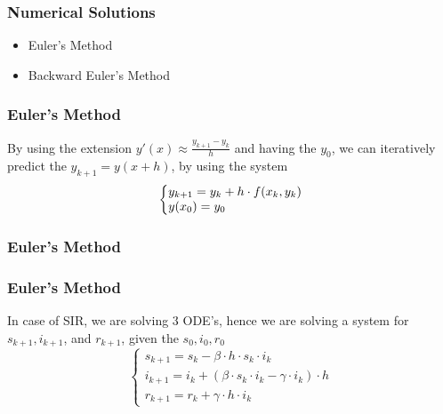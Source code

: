 \documentclass{beamer}
\makeatletter
\newenvironment{system}%
{\left\lbrace\begin{array}{@{}l@{}}}%
{\end{array}\right.}
\makeatother
\begin{document}
\begin{frame}\frametitle{Numerical Solutions}
\begin{itemize}
\item Euler's Method
\item Backward Euler's Method
\end{itemize}
\end{frame}

\begin{frame}\frametitle{Euler's Method}
    By using the extension $y'(x) \approx \frac{y_{k+1}-y_{k}}{h}$ and having the
$y_0$, we can iteratively predict the $y_{k+1}=y(x+h)$, by using the system
\vspace{1.5cm}
\large
\begin{equation*}
    \begin{system}
	    y_{k+1} = y_k + h\cdot f(x_k,y_k)
        \\
        y(x_0)=y_0
    \end{system}
\end{equation*}

\end{frame}

\begin{frame}\frametitle{Euler's Method}

\end{frame}

\begin{frame}\frametitle{Euler's Method}
In case of SIR, we are solving 3 ODE's, hence we are solving a system
for $s_{k+1}, i_{k+1}$, and $r_{k+1}$, given the $s_0, i_0, r_0$
\vspace{0.7cm}
\Large
\[
	\left\{
		\begin{array}{l}
			s_{k+1}=s_k - \beta \cdot h \cdot s_k \cdot i_k \\
			i_{k+1}=i_k + (\beta \cdot s_k \cdot i_k - \gamma \cdot i_k) \cdot h \\
			r_{k+1}=r_k+ \gamma \cdot h \cdot i_k
		\end{array}
	\right.
\]
\end{frame}
\end{document}
